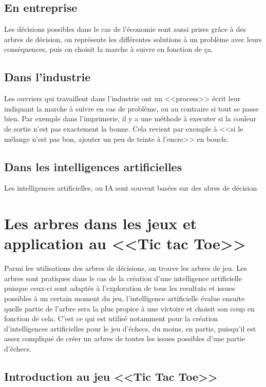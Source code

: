 \documentclass{article}
\begin{document}
\subsection{En entreprise}

Les décisions possibles dans le cas de l'économie sont aussi prises grâce à des
arbres de décision,
on représente les différentes solutions à un problème avec leurs conséquences,
puis on choisit
la marche à suivre en fonction de ça.

\subsection{Dans l'industrie}

Les ouvriers qui travaillent dans l'industrie ont un <<process>> écrit
leur indiquant la marche à suivre en cas de problème,
ou au contraire si tout se passe bien. Par exemple dans l'imprimerie, il y a une
méthode à executer si la
couleur de sortie n'est pas exactement la bonne.
Cela revient par exemple à <<si le mélange n'est pas bon, ajouter un peu de
teinte à l'encre>> en boucle.


\subsection{Dans les intelligences artificielles}

Les intelligences artificielles, ou IA sont souvent basées sur des abres de
décision

\section{Les arbres dans les jeux et application au <<Tic tac Toe>>}

Parmi les utilisations des arbres de décisions, on trouve les arbres de jeu.
Les arbres sont pratiques dans le cas de la création d'une intelligence
artificielle puisque
ceux-ci sont adaptés à l'exploration
de tous les resultats et issues possibles à un certain moment du jeu,
l'intelligence artificielle évalue ensuite quelle partie de l'arbre sera la plus
propice à une victoire et choisit son coup en fonction de cela. C'est ce qui est
utilisé notamment pour la création d'intelligences
artificielles pour le jeu d'échecs, du moins, en partie, puisqu'il est assez compliqué de créer
 un arbres de toutes les issues possibles d'une partie d'échecs.

\subsection{Introduction au jeu <<Tic Tac Toe>>}
\end{document}
